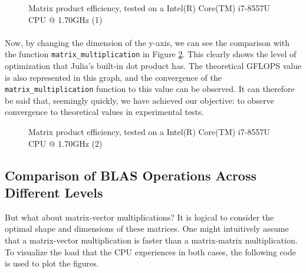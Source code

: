 \begin{figure}[h]
     \begin{center}
         
     \end{center}
     \caption{Matrix product efficiency, tested on a Intel(R) Core(TM) i7-8557U CPU @ 1.70GHz (1)}
     \label{fig:1-dotproductcomparison}
 \end{figure}
 

\paragraph{} Now, by changing the dimension of the y-axis, we can see the comparison with the function \texttt{matrix\_multiplication} 
in Figure \ref{fig:2-dotproductcomparison}. This clearly shows the level of optimization that Julia's built-in dot product has. 
The theoretical GFLOPS value is also represented in this graph, and the convergence of the \texttt{matrix\_multiplication} function to 
this value can be observed. It can therefore be said that, seemingly quickly, we have achieved our objective: to observe 
convergence to theoretical values in experimental tests.

\begin{figure}[h]
     \begin{center}
        
     \end{center}
     \caption{Matrix product efficiency, tested on a Intel(R) Core(TM) i7-8557U CPU @ 1.70GHz (2)}
     \label{fig:2-dotproductcomparison}
 \end{figure}

\clearpage
\newpage


\subsection{Comparison of BLAS Operations Across Different Levels}
But what about matrix-vector multiplications? It is logical to consider the optimal shape and dimensions of these matrices. 
One might intuitively assume that a matrix-vector multiplication is faster than a matrix-matrix multiplication.
To visualize the load that the CPU experiences in both cases, the following code is used to plot the figures.

\vspace*{0.5cm}



